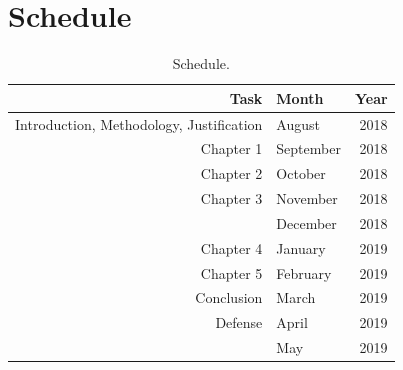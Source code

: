 \documentclass[12pt,twoside,a4paper]{book}
\numberwithin{equation}{section}
\theoremstyle{remark}
\begin{document}
\chapter{Schedule}

\begin{table}[h]
\centering

\begin{tabular}{|r|lr|}
\hline
Task & Month&Year \\ 
\hline                               
Introduction, Methodology, Justification & August & 2018 \\
Chapter 1& September & 2018 \\
Chapter 2 &October & 2018 \\
Chapter 3&November & 2018 \\
 &December & 2018 \\
Chapter 4&January & 2019 \\
Chapter 5&February & 2019 \\
Conclusion&March & 2019 \\
Defense&April & 2019 \\
 &May & 2019   \\ 
\hline
\end{tabular}
\caption{Schedule.}
\label{tab:schedule}
\end{table}
\end{document}

